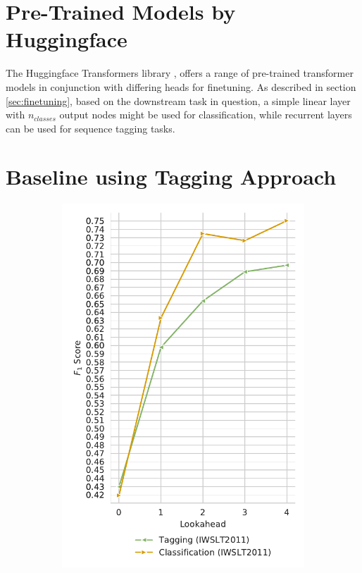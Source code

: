 \documentclass[bsc,deptreport,ai]{infthesis} %
\begin{document}
\section{Pre-Trained Models by Huggingface}
The Huggingface Transformers library \citep{huggingface}, offers a range of pre-trained transformer models in conjunction with differing heads for finetuning. As described in section \ref{sec:finetuning}, based on the downstream task in question, a simple linear layer with $n_{classes}$ output nodes might be used for classification, while recurrent layers can be used for sequence tagging tasks.

\section{Baseline using Tagging Approach}
\begin{figure}
\centering
\begin{subfigure}{.49\textwidth}
\centering
\includegraphics[width=.95\textwidth]{tagclassiwslt.pdf}

\end{subfigure}
\end{figure}
\end{document}
